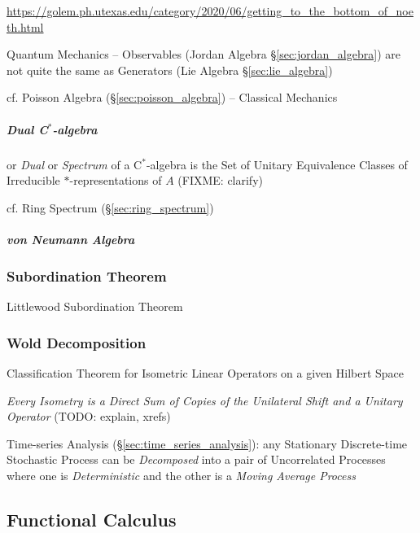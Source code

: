\url{https://golem.ph.utexas.edu/category/2020/06/getting_to_the_bottom_of_noeth.html}{

Quantum Mechanics -- Observables (Jordan Algebra \S\ref{sec:jordan_algebra}) are
not quite the same as Generators (Lie Algebra \S\ref{sec:lie_algebra})

cf. Poisson Algebra (\S\ref{sec:poisson_algebra}) -- Classical Mechanics



\subparagraph{Dual C$^*$-algebra}\label{sec:cstar_dual}\hfill

or \emph{Dual} or \emph{Spectrum} of a C$^*$-algebra is the Set of Unitary
Equivalence Classes of Irreducible $*$-representations of $A$ (FIXME: clarify)

cf. Ring Spectrum (\S\ref{sec:ring_spectrum})



\subparagraph{von Neumann Algebra}\label{sec:vonneumann_algebra}\hfill



\subsubsection{Subordination Theorem}\label{sec:subordination_theorem}

Littlewood Subordination Theorem



\subsubsection{Wold Decomposition}\label{sec:wold_decomposition}

Classification Theorem for Isometric Linear Operators on a given Hilbert Space

\emph{Every Isometry is a Direct Sum of Copies of the Unilateral Shift and a
  Unitary Operator}
(TODO: explain, xrefs)

Time-series Analysis (\S\ref{sec:time_series_analysis}): any Stationary
Discrete-time Stochastic Process can be \emph{Decomposed} into a pair of
Uncorrelated Processes where one is \emph{Deterministic} and the other is a
\emph{Moving Average Process}



\subsection{Functional Calculus}\label{sec:functional_calculus}

}
